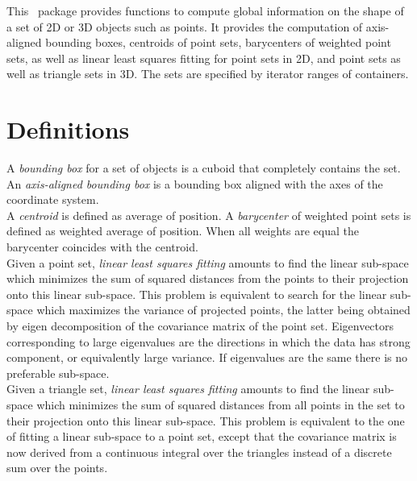 This \cgal\ package provides functions to compute global information
on the shape of a set of 2D or 3D objects such as points. It provides the computation of axis-aligned bounding boxes, centroids of point sets, barycenters of weighted point sets, as well as linear least squares fitting for point sets in 2D, and point sets as well as triangle sets in 3D. The sets are specified by iterator ranges of containers.\\

\section{Definitions}

A \emph{bounding box} for a set of objects is a cuboid that completely
contains the set. An \emph{axis-aligned bounding box} is a bounding box
aligned with the axes of the coordinate system.\\

A \emph{centroid} is defined as average of position. A \emph{barycenter} of weighted point sets is defined as weighted average of position. When all weights are equal the barycenter coincides with the centroid.\\

Given a point set, \emph{linear least squares fitting} amounts to
find the linear sub-space which minimizes the sum of squared
distances from the points to their projection onto this linear
sub-space. This problem is equivalent to search for the linear
sub-space which maximizes the variance of projected points, the latter
being obtained by eigen decomposition of the covariance
matrix of the point set. Eigenvectors corresponding to large eigenvalues are the
directions in which the data has strong component, or equivalently
large variance. If eigenvalues are the same there is no preferable
sub-space.\\

Given a triangle set, \emph{linear least squares fitting} amounts to find the linear sub-space which minimizes the sum of squared
distances from all points in the set to their projection onto this linear
sub-space. This problem is equivalent to the one of fitting a linear sub-space to a point set, except that the covariance matrix is now derived from a continuous integral over the triangles instead of a discrete sum over the points.


